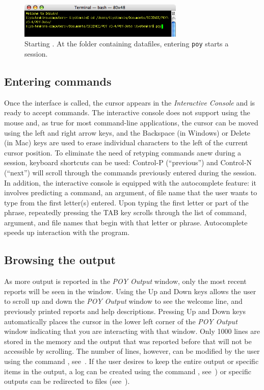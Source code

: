 \begin{figure}[htbp]
   \centering
   \includegraphics[width=0.7\textwidth]{figures/figprelim2.jpg}
   \caption{Starting \poy. At the folder containing datafiles, entering \texttt{poy} starts a \poy session.}
   \label{fig:figprelim2}
\end{figure}

\subsection{Entering commands}
Once the \poy interface is called, the cursor appears in the \emph{Interactive Console} and \poy is ready to accept commands. The interactive console does not support using the mouse and, as true for most command-line applications, the cursor can be moved using the left and right arrow keys, and the Backspace (in Windows) or Delete (in Mac) keys are used to erase individual characters to the left of the current cursor position. To eliminate the need of retyping commands anew during a \poy session, keyboard shortcuts can be used: Control-P (``previous'') and Control-N (``next'') will scroll through the commands previously entered during the session. In addition, the interactive console is equipped with the autocomplete feature: it involves \poy predicting a command, an argument, of file name that the user wants to type from the first letter(s) entered. Upon typing the first letter or part of the phrase, repeatedly pressing the TAB key scrolls through the list of command, argument, and file names that begin with that letter or phrase. Autocomplete speeds up interaction with the program.

\subsection{Browsing the output}
As more output is reported in the \emph{POY Output} window, only the most recent reports will be seen in the window. Using the Up and Down keys allows the user to scroll up and down the \emph{POY Output} window to see the welcome line, and previously printed reports and help descriptions. Pressing Up and Down keys automatically places the cursor in the lower left corner of the \emph{POY Output} window indicating that you are interacting with that window. Only 1000 lines are stored in the memory and the output that was reported before that will not be accessible by scrolling. The number of lines, however, can be modified by the user using the command , see~. If the user desires to keep the entire output or specific items in the output, a log can be created using the command , see~) or specific outputs can be redirected to files (see~).

